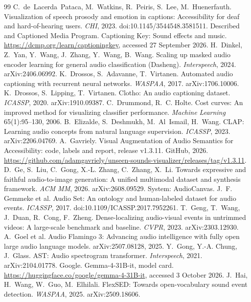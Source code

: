 \begin{thebibliography}{99}
 C.~de~Lacerda~Pataca, M.~Watkins, R.~Peiris, S.~Lee, M.~Huenerfauth. Visualization of speech prosody and emotion in captions: Accessibility for deaf and hard-of-hearing users. \emph{CHI}, 2023. doi:10.1145/3544548.3581511.
 Described and Captioned Media Program. Captioning Key: Sound effects and music. \url{https://dcmp.org/learn/captioningkey}, accessed 27 September 2026.
 H.~Dinkel, Z.~Yan, Y.~Wang, J.~Zhang, Y.~Wang, B.~Wang. Scaling up masked audio encoder learning for general audio classification (Dasheng). \emph{Interspeech}, 2024. arXiv:2406.06992.
 K.~Drossos, S.~Adavanne, T.~Virtanen. Automated audio captioning with recurrent neural networks. \emph{WASPAA}, 2017. arXiv:1706.10006.
 K.~Drossos, S.~Lipping, T.~Virtanen. Clotho: An audio captioning dataset. \emph{ICASSP}, 2020. arXiv:1910.09387.
 C.~Drummond, R.~C. Holte. Cost curves: An improved method for visualizing classifier performance. \emph{Machine Learning} 65(1):95--130, 2006.
 B.~Elizalde, S.~Deshmukh, M.~Al~Ismail, H.~Wang. CLAP: Learning audio concepts from natural language supervision. \emph{ICASSP}, 2023. arXiv:2206.04769.
 A.~Gavriely. Visual Augmentation of Audio Semantics for Accessibility: code, labels and report, release v1.3.11. GitHub, 2026. \url{https://github.com/adamgavriely/unseen-sounds-visualizer/releases/tag/v1.3.11}.
 D.~Ge, S.~Liu, C.~Gong, X.-L. Zhang, C.~Zhang, X.~Li. Towards expressive and faithful audio-to-image generation: A unified multimodal dataset and synthesis framework. \emph{ACM MM}, 2026. arXiv:2608.09529. System: AudioCanvas.
 J.~F. Gemmeke et al. Audio Set: An ontology and human-labeled dataset for audio events. \emph{ICASSP}, 2017. doi:10.1109/ICASSP.2017.7952261.
 T.~Geng, T.~Wang, J.~Duan, R.~Cong, F.~Zheng. Dense-localizing audio-visual events in untrimmed videos: A large-scale benchmark and baseline. \emph{CVPR}, 2023. arXiv:2303.12930.
 A.~Goel et al. Audio Flamingo 3: Advancing audio intelligence with fully open large audio language models. arXiv:2507.08128, 2025.
 Y.~Gong, Y.-A. Chung, J.~Glass. AST: Audio spectrogram transformer. \emph{Interspeech}, 2021. arXiv:2104.01778.
 Google. Gemma-4-31B-it, model card. \url{https://huggingface.co/google/gemma-4-31B-it}, accessed 3 October 2026.
 J.~Hai, H.~Wang, W.~Guo, M.~Elhilali. FlexSED: Towards open-vocabulary sound event detection. \emph{WASPAA}, 2025. arXiv:2509.18606.

\end{thebibliography}
